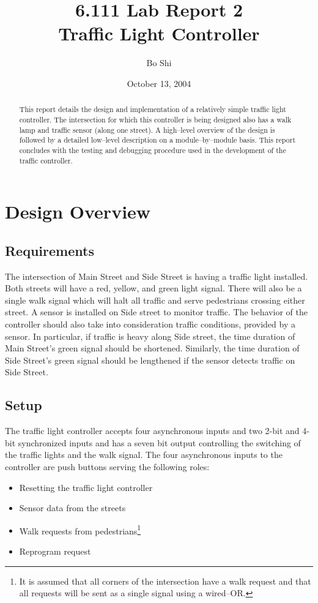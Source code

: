 \documentclass{article}
\author{Bo Shi}
\title{6.111 Lab Report 2 \\ Traffic Light Controller}
\date{October 13, 2004}
\begin{document}
\maketitle

\begin{abstract}
This report details the design and implementation of a relatively simple
traffic light controller.  The intersection for which this controller is being
designed also has a walk lamp and traffic sensor (along one street).  A
high--level overview of the design is followed by a detailed low--level
description on a module--by--module basis.  This report concludes with the
testing and debugging procedure used in the development of the traffic
controller.
\end{abstract}

\newpage
\tableofcontents

\newpage
\listoffigures 
\listoftables 

\newpage
\section{Design Overview}
	\subsection{Requirements}
	The intersection of Main Street and Side Street is having a traffic
	light installed.  Both streets will have a red, yellow, and green light
	signal.  There will also be a single walk signal which will halt all
	traffic and serve pedestrians crossing either street.  A sensor is
	installed on Side street to monitor traffic.  The behavior of the
	controller should also take into consideration traffic conditions,
	provided by a sensor.  In particular, if traffic is heavy along Side
	street, the time duration of Main Street's green signal should be
	shortened.  Similarly, the time duration of Side Street's green signal
	should be lengthened if the sensor detects traffic on Side Street.
		
	\subsection{Setup}
	The traffic light controller accepts four asynchronous inputs and two
	2-bit and 4-bit synchronized inputs and has a seven bit output
	controlling the switching of the traffic lights and the walk signal.
	The four asynchronous inputs to the controller are push buttons serving
	the following roles:
	\begin{itemize}
		\item Resetting the traffic light controller
		\item Sensor data from the streets
		\item Walk requests from pedestrians\footnote{It is assumed that all corners of the intersection have a walk request and that all requests will be sent as a single signal using a wired--OR.}
		\item Reprogram request
	\end{itemize}
\end{document}
